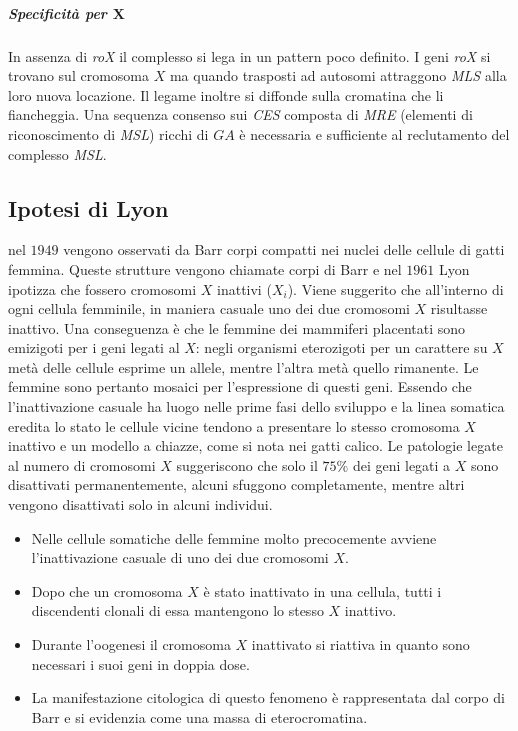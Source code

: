 				\subparagraph{Specificit\`a per $\mathbf{X}$}
				In assenza di \emph{roX} il complesso si lega in un pattern poco definito.
				I geni \emph{roX} si trovano sul cromosoma $X$ ma quando trasposti ad autosomi attraggono \emph{MLS} alla loro nuova locazione.
				Il legame inoltre si diffonde sulla cromatina che li fiancheggia.
				Una sequenza consenso sui \emph{CES} composta di \emph{MRE} (elementi di riconoscimento di \emph{MSL}) ricchi di $GA$ \`e necessaria e sufficiente al reclutamento del complesso \emph{MSL}.

	\subsection{Ipotesi di Lyon}
	nel $1949$ vengono osservati da Barr corpi compatti nei nuclei delle cellule di gatti femmina.
	Queste strutture vengono chiamate corpi di Barr e nel $1961$ Lyon ipotizza che fossero cromosomi $X$ inattivi ($X_i$).
	Viene suggerito che all'interno di ogni cellula femminile, in maniera casuale uno dei due cromosomi $X$ risultasse inattivo.
	Una conseguenza \`e che le femmine dei mammiferi placentati sono emizigoti per i geni legati al $X$: negli organismi eterozigoti per un carattere su $X$ met\`a delle cellule esprime un allele, mentre l'altra met\`a quello rimanente.
	Le femmine sono pertanto mosaici per l'espressione di questi geni.
	Essendo che l'inattivazione casuale ha luogo nelle prime fasi dello sviluppo e la linea somatica eredita lo stato le cellule vicine tendono a presentare lo stesso cromosoma $X$ inattivo e un modello a chiazze, come si nota nei gatti calico.
	Le patologie legate al numero di cromosomi $X$ suggeriscono che solo il $75\%$ dei geni legati a $X$ sono disattivati permanentemente, alcuni sfuggono completamente, mentre altri vengono disattivati solo in alcuni individui.
	\begin{multicols}{2}
		\begin{itemize}
			\item Nelle cellule somatiche delle femmine molto precocemente avviene l'inattivazione casuale di uno dei due cromosomi $X$.
			\item Dopo che un cromosoma $X$ \`e stato inattivato in una cellula, tutti i discendenti clonali di essa mantengono lo stesso $X$ inattivo.
			\item Durante l'oogenesi il cromosoma $X$ inattivato si riattiva in quanto sono necessari i suoi geni in doppia dose.
			\item La manifestazione citologica di questo fenomeno \`e rappresentata dal corpo di Barr e si evidenzia come una massa di eterocromatina.
		\end{itemize}
	\end{multicols}

